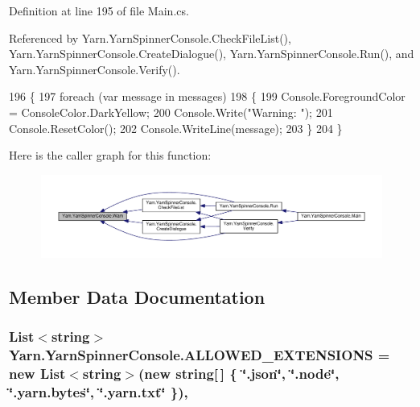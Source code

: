 Definition at line 195 of file Main.\-cs.



Referenced by Yarn.\-Yarn\-Spinner\-Console.\-Check\-File\-List(), Yarn.\-Yarn\-Spinner\-Console.\-Create\-Dialogue(), Yarn.\-Yarn\-Spinner\-Console.\-Run(), and Yarn.\-Yarn\-Spinner\-Console.\-Verify().


\begin{DoxyCode}
196         \{
197             \textcolor{keywordflow}{foreach} (var message \textcolor{keywordflow}{in} messages)
198             \{
199                 Console.ForegroundColor = ConsoleColor.DarkYellow;
200                 Console.Write(\textcolor{stringliteral}{"Warning: "});
201                 Console.ResetColor();
202                 Console.WriteLine(message);
203             \}
204         \}
\end{DoxyCode}


Here is the caller graph for this function\-:
\nopagebreak
\begin{figure}[H]
\begin{center}
\leavevmode
\includegraphics[width=350pt]{a00195_a979bb6f049b6c5294f745a19e24ddd9d_icgraph}
\end{center}
\end{figure}




\subsection{Member Data Documentation}
\hypertarget{a00195_a0979de7ea02c8c0375b8220a12e6575e}{
\subsubsection[{A\-L\-L\-O\-W\-E\-D\-\_\-\-E\-X\-T\-E\-N\-S\-I\-O\-N\-S}]{\setlength{\rightskip}{0pt plus 5cm}List$<$string$>$ Yarn.\-Yarn\-Spinner\-Console.\-A\-L\-L\-O\-W\-E\-D\-\_\-\-E\-X\-T\-E\-N\-S\-I\-O\-N\-S = new List$<$string$>$(new string\mbox{[}$\,$\mbox{]} \{ \char`\"{}.json\char`\"{}, \char`\"{}.node\char`\"{}, \char`\"{}.yarn.\-bytes\char`\"{}, \char`\"{}.yarn.\-txt\char`\"{} \})\hspace{0.3cm}{\ttfamily [static]}, {\ttfamily [package]}}}\label{a00195_a0979de7ea02c8c0375b8220a12e6575e}


